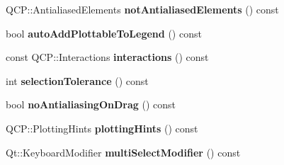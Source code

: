 \begin{DoxyCompactItemize}
\item 
\hypertarget{classQCustomPlot_a8060cee59757213764382a78d3196189}{}Q\+C\+P\+::\+Antialiased\+Elements {\bfseries not\+Antialiased\+Elements} () const \label{classQCustomPlot_a8060cee59757213764382a78d3196189}

\item 
\hypertarget{classQCustomPlot_ad1599fc3fd1833b5988f6b89c1f616ca}{}bool {\bfseries auto\+Add\+Plottable\+To\+Legend} () const \label{classQCustomPlot_ad1599fc3fd1833b5988f6b89c1f616ca}

\item 
\hypertarget{classQCustomPlot_a12401c02b6949a717f5749bb28c62983}{}const Q\+C\+P\+::\+Interactions {\bfseries interactions} () const \label{classQCustomPlot_a12401c02b6949a717f5749bb28c62983}

\item 
\hypertarget{classQCustomPlot_a7b738074c75e80070ef6a10263c6cd69}{}int {\bfseries selection\+Tolerance} () const \label{classQCustomPlot_a7b738074c75e80070ef6a10263c6cd69}

\item 
\hypertarget{classQCustomPlot_ae07f2895a34d13a97a10cae4d8e17a36}{}bool {\bfseries no\+Antialiasing\+On\+Drag} () const \label{classQCustomPlot_ae07f2895a34d13a97a10cae4d8e17a36}

\item 
\hypertarget{classQCustomPlot_a130b55e205697a5288081e9fc11e443e}{}Q\+C\+P\+::\+Plotting\+Hints {\bfseries plotting\+Hints} () const \label{classQCustomPlot_a130b55e205697a5288081e9fc11e443e}

\item 
\hypertarget{classQCustomPlot_a9b6b1a0fea8da3fda6d5e3d687202877}{}Qt\+::\+Keyboard\+Modifier {\bfseries multi\+Select\+Modifier} () const \label{classQCustomPlot_a9b6b1a0fea8da3fda6d5e3d687202877}


\end{DoxyCompactItemize}
